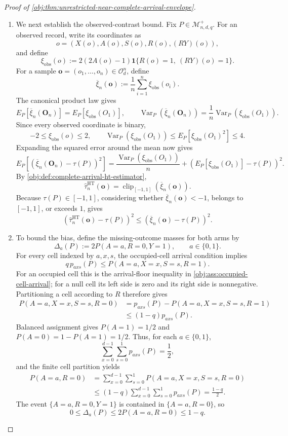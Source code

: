 \begin{proof}[Proof of \cref{obj:thm:unrestricted-near-complete-arrival-envelope}]
\begin{enumerate}
\item We next establish the observed-contrast bound. Fix
\(P\in\mathcal M^{+}_{n,d,q}\). For an observed record, write its coordinates as
\[
o=(X(o),A(o),S(o),R(o),(RY)(o)),
\]
and define
\[
\xi_{\mathrm{obs}}(o)
:=
2(2A(o)-1)\mathbf1\{R(o)=1,\ (RY)(o)=1\}.
\]
For a sample \(\mathbf o=(o_1,\ldots,o_n)\in\mathcal O_d^n\), define
\[
\overline\xi_n(\mathbf o)
:=
\frac1n\sum_{i=1}^n\xi_{\mathrm{obs}}(o_i).
\]
The canonical product law gives
\[
E_P[\overline\xi_n(\mathbf O_n)]
=E_P[\xi_{\mathrm{obs}}(O_1)],
\qquad
\operatorname{Var}_P(\overline\xi_n(\mathbf O_n))
=\frac1n\operatorname{Var}_P(\xi_{\mathrm{obs}}(O_1)).
\]
Since every observed coordinate is binary,
\[
-2\le\xi_{\mathrm{obs}}(o)\le2,
\qquad
\operatorname{Var}_P(\xi_{\mathrm{obs}}(O_1))
\le E_P[\xi_{\mathrm{obs}}(O_1)^2]\le4.
\]
Expanding the squared error around the mean now gives
\[
E_P\!\left[
\left(\overline\xi_n(\mathbf O_n)-\tau(P)\right)^2
\right]
=
\frac{\operatorname{Var}_P(\xi_{\mathrm{obs}}(O_1))}{n}
+
\left(E_P[\xi_{\mathrm{obs}}(O_1)]-\tau(P)\right)^2.
\]
By \cref{obj:def:complete-arrival-ht-estimator},
\[
\widehat\tau^{\mathrm{HT}}_n(\mathbf o)
=
\operatorname{clip}_{[-1,1]}(\overline\xi_n(\mathbf o)).
\]
Because \(\tau(P)\in[-1,1]\), considering whether
\(\overline\xi_n(\mathbf o)<-1\), belongs to \([-1,1]\), or exceeds \(1\), gives
\[
\left(
\widehat\tau^{\mathrm{HT}}_n(\mathbf o)-\tau(P)
\right)^2
\le
\left(\overline\xi_n(\mathbf o)-\tau(P)\right)^2.
\]

\item To bound the bias, define the missing-outcome masses for both arms by
\[
\Delta_a(P)
:=
2P(A=a,R=0,Y=1),
\qquad a\in\{0,1\}.
\]
For every cell indexed by \(a,x,s\), the occupied-cell arrival condition implies
\[
q\,p_{axs}(P)
\le P(A=a,X=x,S=s,R=1).
\]
For an occupied cell this is the arrival-floor inequality in
\cref{obj:ass:occupied-cell-arrival}; for a null cell its left side is zero and its right side is nonnegative. Partitioning a cell according to \(R\) therefore gives
\[
\begin{aligned}
P(A=a,X=x,S=s,R=0)
&=
p_{axs}(P)-P(A=a,X=x,S=s,R=1)\\
&\le(1-q)p_{axs}(P).
\end{aligned}
\]
Balanced assignment gives \(P(A=1)=1/2\) and
\(P(A=0)=1-P(A=1)=1/2\). Thus, for each \(a\in\{0,1\}\),
\[
\sum_{x=0}^{d-1}\sum_{s=0}^{1}p_{axs}(P)=\frac12,
\]
and the finite cell partition yields
\[
\begin{aligned}
P(A=a,R=0)
&=
\sum_{x=0}^{d-1}\sum_{s=0}^{1}
P(A=a,X=x,S=s,R=0)\\
&\le
(1-q)\sum_{x=0}^{d-1}\sum_{s=0}^{1}p_{axs}(P)
=\frac{1-q}{2}.
\end{aligned}
\]
The event \(\{A=a,R=0,Y=1\}\) is contained in \(\{A=a,R=0\}\), so
\[
0\le\Delta_a(P)\le2P(A=a,R=0)\le1-q.
\]


\end{enumerate}
\end{proof}
